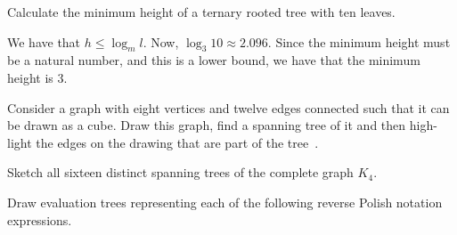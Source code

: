 \documentclass[addpoints,12pt]{exam}
\begin{document}
\begin{questions}
\question
Calculate the minimum height of a ternary rooted tree with ten leaves.
\begin{solution}
We have that $h \leq  \log_m l$.
Now, $\log_3 10 \approx 2.096$.
Since the minimum height must be a natural number, and this is a lower bound, we have that the minimum height is 3.
\end{solution}

\question
Consider a graph with eight vertices and twelve edges connected such that it can be drawn as a cube.
Draw this graph, find a spanning tree of it and then high-light the edges on the drawing that are part of the tree~\cite{biggs02}.

\question
Sketch all sixteen distinct spanning trees of the complete graph $K_4$.


\question
Draw evaluation trees representing each of the following reverse Polish notation expressions.


\end{questions}



\end{document}
